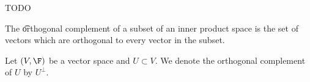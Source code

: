 

TODO


The \t{orthogonal complement} of a subset of an inner product space is the set of vectors which are orthogonal to every vector in the subset.


Let $(V, \F)$ be a vector space and $U \subset V$.
We denote the orthogonal complement of $U$ by $U^{\perp}$.
